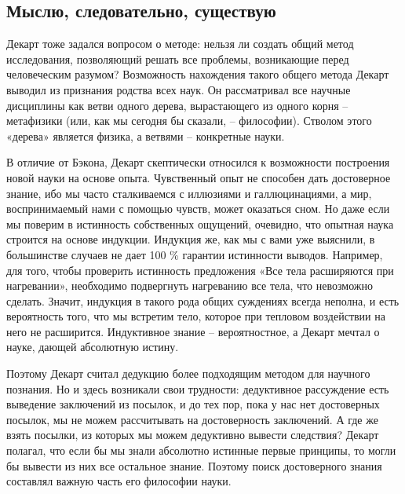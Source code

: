 \documentclass[a4paper, 14pt]{extreport}
\begin{document}
\subsection{Мыслю, следовательно, существую}

Декарт тоже задался вопросом о методе: нельзя ли создать общий метод
исследования, позволяющий решать все проблемы, возникающие перед
человеческим разумом? Возможность нахождения такого общего метода Декарт
выводил из признания родства всех наук. Он рассматривал все научные
дисциплины как ветви одного дерева, вырастающего из одного корня --
метафизики (или, как мы сегодня бы сказали, -- философии). Стволом этого
«дерева» является физика, а ветвями -- конкретные науки.

В отличие от Бэкона, Декарт скептически относился к возможности
построения новой науки на основе опыта. Чувственный опыт не способен
дать достоверное знание, ибо мы часто сталкиваемся с иллюзиями и
галлюцинациями, а мир, воспринимаемый нами с помощью чувств, может
оказаться сном. Но даже если мы поверим в истинность собственных
ощущений, очевидно, что опытная наука строится на основе индукции.
Индукция же, как мы с вами уже выяснили, в большинстве случаев не дает
100 \% гарантии истинности выводов. Например, для того, чтобы проверить
истинность предложения «Все тела расширяются при нагревании», необходимо
подвергнуть нагреванию все тела, что невозможно сделать. Значит,
индукция в такого рода общих суждениях всегда неполна, и есть
вероятность того, что мы встретим тело, которое при тепловом воздействии
на него не расширится. Индуктивное знание -- вероятностное, а Декарт
мечтал о науке, дающей абсолютную истину.

Поэтому Декарт считал дедукцию более подходящим методом для научного
познания. Но и здесь возникали свои трудности: дедуктивное рассуждение
есть выведение заключений из посылок, и до тех пор, пока у нас нет
достоверных посылок, мы не можем рассчитывать на достоверность
заключений. А где же взять посылки, из которых мы можем дедуктивно
вывести следствия? Декарт полагал, что если бы мы знали абсолютно
истинные первые принципы, то могли бы вывести из них все остальное
знание. Поэтому поиск достоверного знания составлял важную часть его
философии науки.
\end{document}

